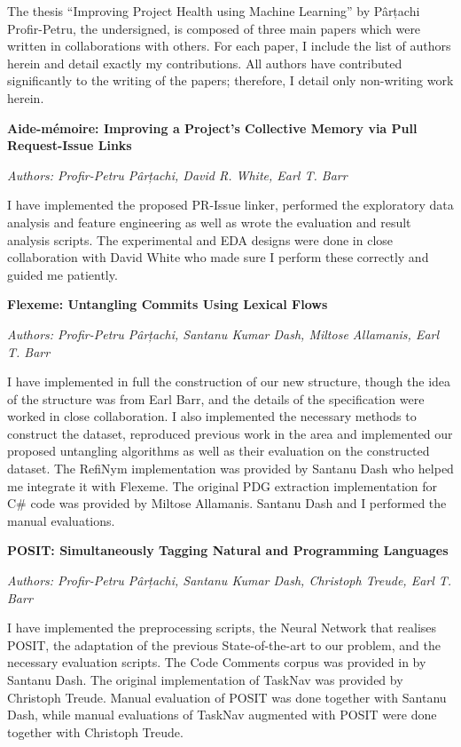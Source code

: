 \begin{conjoint}
The thesis “Improving Project Health using Machine Learning” by Pârțachi
Profir-Petru, the undersigned, is composed of three main papers which were
written in collaborations with others. For each paper, I include the list of
authors herein and detail exactly my contributions. All authors have contributed
significantly to the writing of the papers; therefore, I detail only non-writing
work herein.

\noindent\textbf{Aide-mémoire: Improving a Project’s Collective Memory via Pull
Request-Issue Links} 

\noindent\emph{Authors: Profir-Petru Pârțachi, David R. White, Earl T. Barr}

I have implemented the proposed PR-Issue linker, performed the exploratory data
analysis and feature engineering as well as wrote the evaluation and result
analysis scripts. The experimental and EDA designs were done in close
collaboration with David White who made sure I perform these correctly and
guided me patiently.

\noindent\textbf{Flexeme: Untangling Commits Using Lexical Flows}

\noindent\emph{Authors: Profir-Petru Pârțachi, Santanu Kumar Dash, Miltose
Allamanis, Earl T. Barr}

I have implemented in full the construction of our new structure, though the
idea of the structure was from Earl Barr, and the details of the specification
were worked in close collaboration. I also implemented the necessary methods to
construct the dataset, reproduced previous work in the area and implemented our
proposed untangling algorithms as well as their evaluation on the constructed
dataset. The RefiNym implementation was provided by Santanu Dash who helped me
integrate it with Flexeme. The original PDG extraction implementation for C\#
code was provided by Miltose Allamanis. Santanu Dash and I performed the manual
evaluations.

\noindent\textbf{POSIT: Simultaneously Tagging Natural and Programming
Languages} 

\noindent\emph{Authors: Profir-Petru Pârțachi, Santanu Kumar Dash, Christoph
Treude, Earl T. Barr}

I have implemented the preprocessing scripts, the Neural Network that realises
POSIT, the adaptation of the previous State-of-the-art to our problem, and the
necessary evaluation scripts. The Code Comments corpus was provided in by
Santanu Dash. The original implementation of TaskNav was provided by Christoph
Treude. Manual evaluation of POSIT was done together with Santanu Dash, while
manual evaluations of TaskNav augmented with POSIT were done together with
Christoph Treude.

\end{conjoint}

